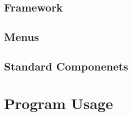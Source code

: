 \documentclass{scrreprt}
\begin{document}
\section{Framework}

\begin{enumerate}[label*=N\arabic*.]
\end{enumerate}

\section{Menus}

\begin{enumerate}[label*=M\arabic*.]
\end{enumerate}

\section{Standard Componenets}

\begin{enumerate}[label*=SC\arabic*.]
\end{enumerate}

\chapter{Program Usage}
\end{document}
